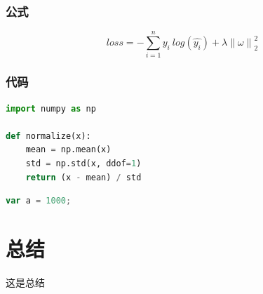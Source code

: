 \documentclass[UTF8,AutoFakeBold=1,AutoFakeSlant,zihao=-4]{SCNU}
\begin{document}
\subsubsection{公式}

\begin{equation}
    loss = - \sum_{i=1}^{n}{y_i\:log(\hat{y_i})} +     \label{eq:0}
    \lambda {\left\lVert\omega\right\rVert}_2^2
\end{equation}

\subsubsection{代码}

\begin{lstlisting}[language=Python]
import numpy as np

def normalize(x):
    mean = np.mean(x)
    std = np.std(x, ddof=1)
    return (x - mean) / std

\end{lstlisting}

\begin{lstlisting}[language=JavaScript]
var a = 1000;

\end{lstlisting}


\begin{references}
    
\end{references}

\section{总结}
这是总结

\end{document}
